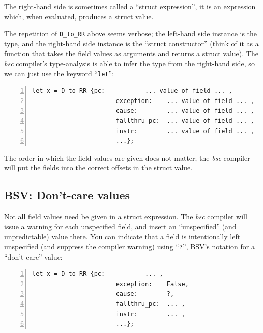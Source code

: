 The right-hand side is sometimes called a ``struct expression'', {\ie}
it is an expression which, when evaluated, produces a struct value.

The repetition of \verb|D_to_RR| above seems verbose; the left-hand
side instance is the type, and the right-hand side instance is the
``struct constructor'' (think of it as a function that takes the field
values as arguments and returns a struct value). The \emph{bsc}
compiler's type-analysis is able to infer the type from the right-hand
side, so we can just use the keyword ``\verb|let|'':


\begin{Verbatim}[frame=single, numbers=left]
      let x = D_to_RR {pc:           ... value of field ... ,
                       exception:    ... value of field ... ,
                       cause:        ... value of field ... ,
                       fallthru_pc:  ... value of field ... ,
                       instr:        ... value of field ... ,
                       ...};
\end{Verbatim}

The order in which the field values are given does not matter; the
\emph{bsc} compiler will put the fields into the correct offsets in
the struct value.


\subsection{BSV: Don't-care values} 

Not all field values need be given in a struct expression.  The
\emph{bsc} compiler will issue a warning for each unspecified field,
and insert an ``unspecified'' (and unpredictable) value there.  You
can indicate that a field is intentionally left unspecified (and
suppress the compiler warning) using ``\verb|?|'', BSV's notation for
a ``don't care'' value:


\begin{Verbatim}[frame=single, numbers=left]
      let x = D_to_RR {pc:           ... ,
                       exception:    False,
                       cause:        ?,
                       fallthru_pc:  ... ,
                       instr:        ... ,
                       ...};
\end{Verbatim}

